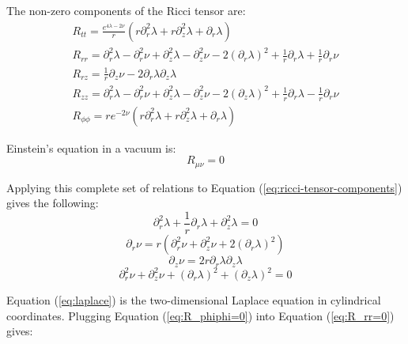 \documentclass{article}
\begin{document}
The non-zero components of the Ricci tensor are:
\begin{equation}
\begin{array}{l}
R_{tt}=\frac{e^{4\lambda-2\nu}}{r}\left(r\partial^{2}_{r}\lambda+r\partial^{2}_{z}\lambda+\partial_{r}\lambda\right)\\
R_{rr}=\partial^{2}_{r}\lambda-\partial^{2}_{r}\nu+\partial^{2}_{z}\lambda-\partial^{2}_{z}\nu-2\left(\partial_{r}\lambda\right)^{2}+\frac{1}{r}\partial_{r}\lambda+\frac{1}{r}\partial_{r}\nu\\
R_{rz}=\frac{1}{r}\partial_{z}\nu-2\partial_{r}\lambda\partial_{z}\lambda\\
R_{zz}=\partial^{2}_{r}\lambda-\partial^{2}_{r}\nu+\partial^{2}_{z}\lambda-\partial^{2}_{z}\nu-2\left(\partial_{z}\lambda\right)^{2}+\frac{1}{r}\partial_{r}\lambda-\frac{1}{r}\partial_{r}\nu\\
R_{\phi\phi}=re^{-2\nu}\left(r\partial^{2}_{r}\lambda+r\partial^{2}_{z}\lambda+\partial_{r}\lambda\right)
\end{array}\label{eq:ricci-tensor-components}
\end{equation}

Einstein's equation in a vacuum is:
\begin{equation}
R_{\mu\nu}=0\label{eq:vacuum-solutions}
\end{equation}

Applying this complete set of relations to Equation (\ref{eq:ricci-tensor-components}) gives the following:
\begin{equation}
\partial^{2}_{r}\lambda+\frac{1}{r}\partial_{r}\lambda+\partial^{2}_{z}\lambda=0\label{eq:laplace}
\end{equation}
\begin{equation}
\partial_{r}\nu=r\left(\partial^{2}_{r}\nu+\partial^{2}_{z}\nu+2\left(\partial_{r}\lambda\right)^{2}\right)\label{eq:R_rr=0}
\end{equation}
\begin{equation}
\partial_{z}\nu=2r\partial_{r}\lambda\partial_{z}\lambda\label{eq:nu_z}
\end{equation}
\begin{equation}
\partial^{2}_{r}\nu+\partial^{2}_{z}\nu+\left(\partial_{r}\lambda\right)^{2}+\left(\partial_{z}\lambda\right)^{2}=0\label{eq:R_phiphi=0}
\end{equation}

Equation (\ref{eq:laplace}) is the two-dimensional Laplace equation in cylindrical coordinates. Plugging Equation (\ref{eq:R_phiphi=0}) into Equation (\ref{eq:R_rr=0}) gives:
\end{document}
